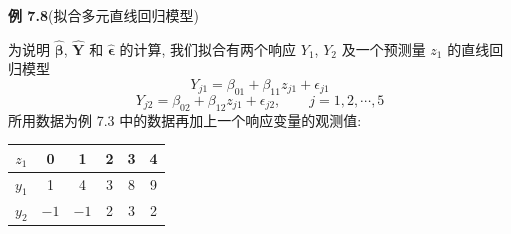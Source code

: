 \noindent\textbf{例 7.8}\quad (拟合多元直线回归模型)

为说明 $\hat{\boldsymbol{\beta}}$, $\hat{\mathbf{Y}}$ 和 $\hat{\boldsymbol{\epsilon}}$ 的计算, 我们拟合有两个响应 $Y_1$, $Y_2$ 及一个预测量 $z_1$ 的直线回归模型
\[
Y_{j1}=\beta_{01}+\beta_{11}z_{j1}+\epsilon_{j1}
\]
\[
Y_{j2}=\beta_{02}+\beta_{12}z_{j1}+\epsilon_{j2},\qquad j=1,2,\cdots,5
\]
所用数据为例 7.3 中的数据再加上一个响应变量的观测值:

\begin{mvtable}
\begin{tabular}{c|ccccc}
\hline
$z_1$ & 0 & 1 & 2 & 3 & 4\\
\hline
$y_1$ & 1 & 4 & 3 & 8 & 9\\
$y_2$ & $-1$ & $-1$ & 2 & 3 & 2\\
\hline
\end{tabular}
\end{mvtable}
